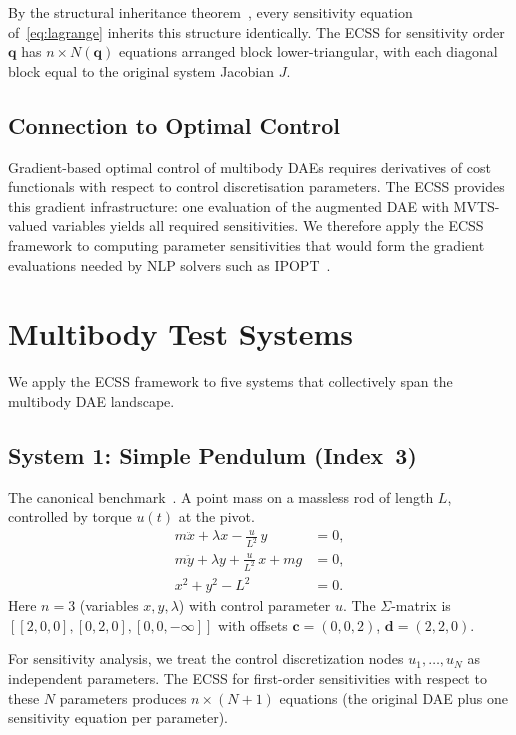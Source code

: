 \documentclass[12pt,a4paper]{article}
\theoremstyle{definition}
\theoremstyle{plain}
\newcommand{\vq}{\mathbf{q}}
\newcommand{\vc}{\mathbf{c}}
\newcommand{\vd}{\mathbf{d}}
\begin{document}
By the structural inheritance theorem~\cite{cao2026structural}, every sensitivity equation of~\eqref{eq:lagrange} inherits this structure identically. The ECSS for sensitivity order $\vq$ has $n \times N(\vq)$ equations arranged block lower-triangular, with each diagonal block equal to the original system Jacobian $J$.

\subsection{Connection to Optimal Control}
Gradient-based optimal control of multibody DAEs requires derivatives of cost functionals with respect to control discretisation parameters. The ECSS provides this gradient infrastructure: one evaluation of the augmented DAE with MVTS-valued variables yields all required sensitivities. We therefore apply the ECSS framework to computing parameter sensitivities that would form the gradient evaluations needed by NLP solvers such as IPOPT~\cite{wachter2006implementation}.

\section{Multibody Test Systems}
\label{sec:systems}

We apply the ECSS framework to five systems that collectively span the multibody DAE landscape.

\subsection{System 1: Simple Pendulum (Index~3)}

The canonical benchmark~\cite{campbell2016solving}. A point mass on a massless rod of length $L$, controlled by torque $u(t)$ at the pivot.
\begin{equation}
  \begin{aligned}
    m\ddot{x} + \lambda x - \frac{u}{L^2}\,y &= 0,\\
    m\ddot{y} + \lambda y + \frac{u}{L^2}\,x + mg &= 0,\\
    x^2 + y^2 - L^2 &= 0.
  \end{aligned}
\end{equation}
Here $n=3$ (variables $x,y,\lambda$) with control parameter $u$. The $\Sigma$-matrix is $[[2,0,0],[0,2,0],[0,0,-\infty]]$ with offsets $\vc=(0,0,2)$, $\vd=(2,2,0)$.

For sensitivity analysis, we treat the control discretization nodes $u_1,\dots,u_N$ as independent parameters. The ECSS for first-order sensitivities with respect to these $N$ parameters produces $n \times (N+1)$ equations (the original DAE plus one sensitivity equation per parameter).
\end{document}

